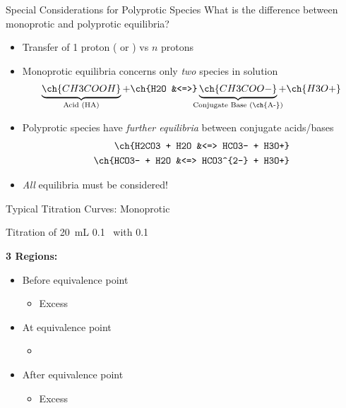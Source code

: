 \documentclass[notes=show]{beamer}
\begin{document}
\begin{frame}{Special Considerations for Polyprotic Species}
	What is the difference between monoprotic and polyprotic equilibria?
	\begin{itemize}[<+->]
		\item Transfer of 1 proton ( or ) vs $n$ protons
		\item Monoprotic equilibria concerns only \emph{two} species in
			solution
			\begin{align*}
				\underbrace{\ch{CH3COOH}}_{\mathclap{\text{Acid
				(HA)}}} +
				\ch{H2O &<=>}
				\underbrace{\ch{CH3COO-}}_{\mathclap{\text{Conjugate
				Base (\ch{A-})}}} + \ch{H3O+}
			\end{align*}
		\item Polyprotic species have \emph{further equilibria} between
			conjugate acids/bases
			\begin{align*}
				\ch{H2CO3 + H2O &<=> HCO3- + H3O+} \\
				\ch{HCO3- + H2O &<=> HCO3^{2-} + H3O+}
			\end{align*}
		\item \emph{All} equilibria must be considered!
	\end{itemize}
\end{frame}

\begin{frame}[t]{Typical Titration Curves: Monoprotic}
	\begin{center}
		Titration of \SI{20}{\milli\liter} \SI{0.1}{\Molar}~
		with \SI{0.1}{\Molar}~
	\end{center}

	\begin{minipage}{0.45\linewidth}
		\centering
		
	\end{minipage}
	\hfill
	\begin{minipage}{0.45\linewidth}
		{\bfseries 3 Regions:}
		\begin{itemize}
			\item \alert{Before} equivalence point
				\begin{itemize}
					\item<2-> Excess 
				\end{itemize}
			\item \alert{At} equivalence point
				\begin{itemize}
					\item<3-> \ch{[NaOH] = [HCl]}
				\end{itemize}
			\item \alert{After} equivalence point
				\begin{itemize}
					\item<4-> Excess 
				\end{itemize}
		\end{itemize}
	\end{minipage}
\end{frame}
\end{document}
